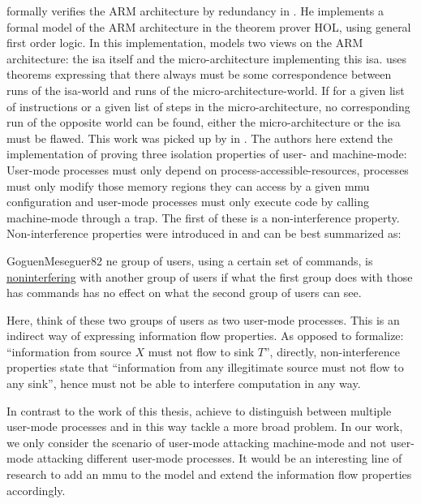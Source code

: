 \citeauthor{Fox02} formally verifies the ARM architecture by redundancy in  \cite{Fox02}.
He implements a formal model of the ARM architecture in the theorem prover HOL, using general first order logic.
In this implementation, \citeauthor{Fox02} models two views on the ARM architecture: the \gls{isa} itself and the micro-architecture implementing this \gls{isa}.
\citeauthor{Fox02} uses theorems expressing that there always must be some correspondence between runs of the \gls{isa}-world and runs of the micro-architecture-world.
If for a given list of instructions or a given list of steps in the micro-architecture, no corresponding run of the opposite world can be found, either the micro-architecture or the \gls{isa} must be flawed.
This work was picked up by \citeauthor{KhakpourSD13} in  \cite{KhakpourSD13}.
The authors here extend the implementation of \citeauthor{Fox02} proving three isolation properties of user- and machine-mode:
User-mode processes must only depend on process-accessible-resources, processes must only modify those memory regions they can access by a given \gls{mmu} configuration and user-mode processes must only execute code by calling machine-mode through a trap.
The first of these is a non-interference property.
Non-interference properties were introduced in \cite{GoguenMeseguer82} and can be best summarized as:
\begin{displaycquote}[p.11]{GoguenMeseguer82}
    ne group of users, using a certain set of commands, is \underline{noninterfering} with another group of users if what the first group does with those has commands has no effect on what the second group of users can see.
\end{displaycquote}
Here, think of these two groups of users as two user-mode processes.
This is an indirect way of expressing information flow properties.
As opposed to formalize: \enquote{information from source $ X $ must not flow to sink $ T $}, directly, non-interference properties state that \enquote{information from any illegitimate source must not flow to any sink}, hence must not be able to interfere computation in any way.

In contrast to the work of this thesis, \citeauthor{KhakpourSD13} achieve to distinguish between multiple user-mode processes and in this way tackle a more broad problem.
In our work, we only consider the scenario of user-mode attacking machine-mode and not user-mode attacking different user-mode processes.
It would be an interesting line of research to add an \gls{mmu} to the model and extend the information flow properties accordingly.

